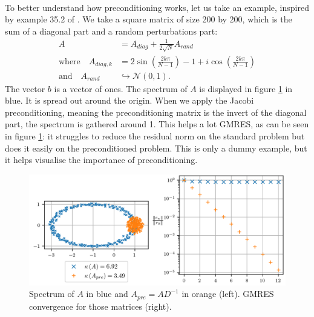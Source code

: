       \paragraph{}
       To better understand how preconditioning works, let us take an example, inspired by example 35.2 of \cite{TrefethenBau1997}.
       We take a square matrix of size 200 by 200, which is the sum of a diagonal part and a random perturbations part:
       \begin{equation}
         \begin{aligned}
           A &= A_{diag} + \frac{1}{2\sqrt{N}}A_{rand} \\
           \textrm{where}\quad A_{diag, k} &= 2\sin\left( \frac{2 k \pi}{N - 1} \right) - 1 + i \cos\left( \frac{2 k \pi}{N - 1} \right) \\
           \textrm{and}\quad A_{rand} &\hookrightarrow \mathcal{N}\left(0, 1\right) .
         \end{aligned}
       \end{equation}
       The vector $b$ is a vector of ones.
       The spectrum of $A$ is displayed in figure \ref{fig:preconditioning} in blue.
       It is spread out around the origin.
       When we apply the Jacobi preconditioning, meaning the preconditioning matrix is the invert of the diagonal part, the spectrum is gathered around 1.
       This helps a lot GMRES, as can be seen in figure \ref{fig:preconditioning}: it struggles to reduce the residual norm on the standard problem but does it easily on the preconditioned problem.
       This is only a dummy example, but it helps visualise the importance of preconditioning.

   		\begin{figure}
   			\centering
   			\includegraphics{figures/preconditioning.png}
   			\caption{Spectrum of $A$ in blue and $A_{pre} = AD^{-1}$ in orange (left). GMRES convergence for those matrices (right).}
   			\label{fig:preconditioning}
   		\end{figure}

